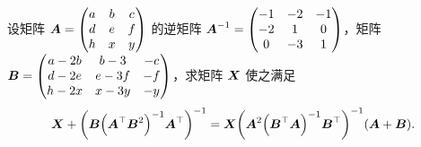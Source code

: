 \begin{example}[2016 浙江大学]
    设矩阵 $\vb*{A}=\begin{pmatrix}
            a & b & c \\
            d & e & f \\
            h & x & y
        \end{pmatrix}$ 的逆矩阵 $\vb*{A}^{-1}=\begin{pmatrix}
            -1 & -2 & -1 \\
            -2 & 1  & 0  \\
            0  & -3 & 1
        \end{pmatrix}$，矩阵 $\vb*{B}=\begin{pmatrix}
            a-2b & b-3  & -c \\
            d-2e & e-3f & -f \\
            h-2x & x-3y & -y
        \end{pmatrix}$，求矩阵 $\vb*{X}$ 使之满足
    $$\vb*{X}+\qty(\vb*{B}\qty(\vb*{A}^{\top}\vb*{B}^2)^{-1}\vb*{A}^{\top})^{-1}=\vb*{X}\qty(\vb*{A}^2\qty(\vb*{B}^{\top}\vb*{A})^{-1}\vb*{B}^{\top})^{-1}(\vb*{A}+\vb*{B}).$$
\end{example}

